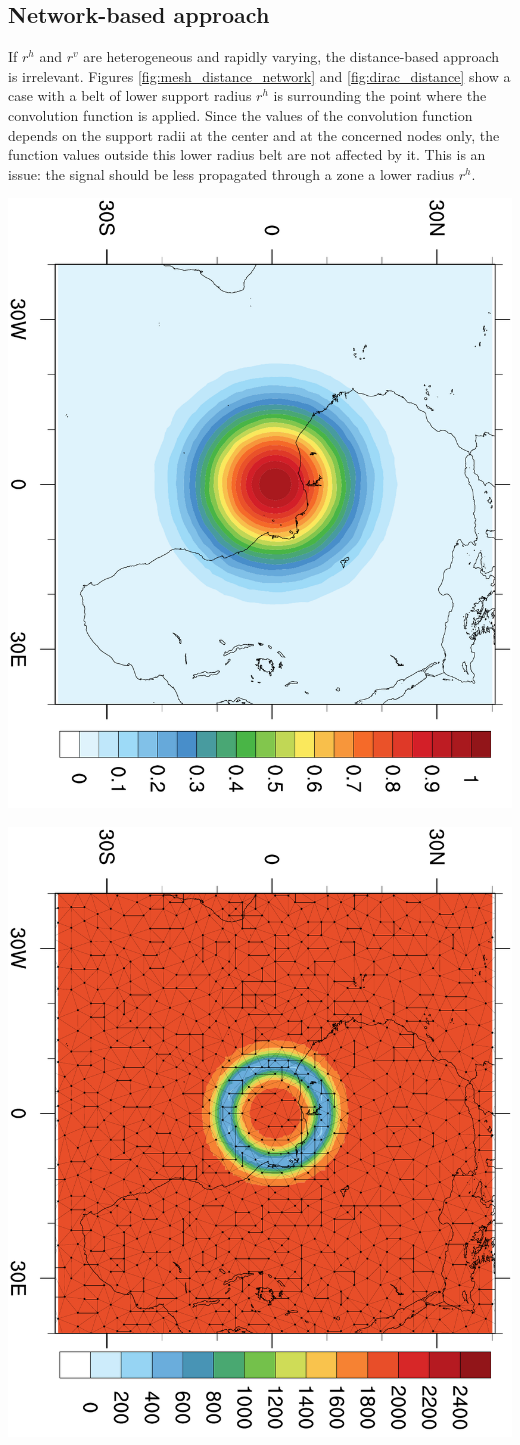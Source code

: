 \documentclass[12pt]{scrartcl}
\begin{document}
\subsection{Network-based approach}
If $r^h$ and $r^v$ are heterogeneous and rapidly varying, the distance-based approach is irrelevant. Figures \ref{fig:mesh_distance_network} and \ref{fig:dirac_distance} show a case with a belt of lower support radius $r^h$ is surrounding the point where the convolution function is applied. Since the values of the convolution function depends on the support radii at the center and at the concerned nodes only, the function values outside this lower radius belt are not affected by it. This is an issue: the signal should be less propagated through a zone a lower radius $r^h$.

\begin{center}
\includegraphics[height=0.63\linewidth,angle=90]{arp_6B60_dirac_001_ref.pdf}
\end{center}
\begin{center}
\includegraphics[height=0.63\linewidth,angle=90]{arp_6B60_mesh_001_distance_network.pdf}
\end{center}
\end{document}
